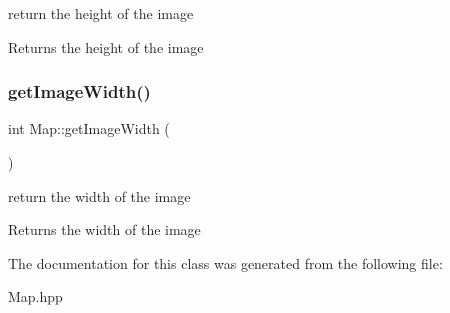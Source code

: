 return the height of the image 

\begin{DoxyReturn}{Returns}
the height of the image 
\end{DoxyReturn}
\mbox{\label{class_map_a2ed476fb2f9142980ce447df2b066638}} 
\subsubsection{\texorpdfstring{get\+Image\+Width()}{getImageWidth()}}
{\footnotesize\ttfamily int Map\+::get\+Image\+Width (\begin{DoxyParamCaption}{ }\end{DoxyParamCaption})}



return the width of the image 

\begin{DoxyReturn}{Returns}
the width of the image 
\end{DoxyReturn}


The documentation for this class was generated from the following file\+:\begin{DoxyCompactItemize}
\item 
Map.\+hpp\end{DoxyCompactItemize}

